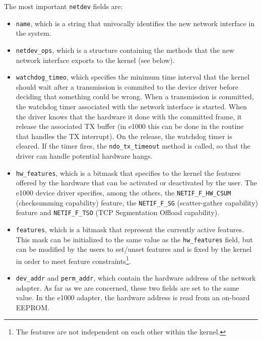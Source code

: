 The most important \texttt{netdev} fields are:
\begin{itemize}
    \item \texttt{name}, which is a string that univocally identifies the new network interface in the system.
    
    \item \texttt{netdev\_ops}, which is a structure containing the methods that the new network interface exports to the kernel 
	  (see below).
	  
    \item \texttt{watchdog\_timeo}, which specifies the minimum time interval that the kernel should wait after a transmission is commited
	  to the device driver before deciding that something could be wrong. When a transmission is committed, the watchdog timer 
	  associated with the network interface is started. When the driver knows that the hardware it done with the committed frame,
	  it release the associated TX buffer (in e1000 this can be done in the routine that handles the TX interrupt). On the release,
	  the watchdog timer is cleared. If the timer fires, the \texttt{ndo\_tx\_timeout} method is called, so that the driver can
	  handle potential hardware hangs.
	  
    \item \texttt{hw\_features}, which is a bitmask that specifies to the kernel the features offered by the hardware that can be activated
	  or deactivated by the user. The e1000 device driver specifies, among the others, the \texttt{NETIF\_F\_HW\_CSUM} (checksumming
	  capability) feature, the \texttt{NETIF\_F\_SG} (scatter-gather capability) feature and \texttt{NETIF\_F\_TSO} (TCP Segmentation
	  Offload capability).
	  
    \item \texttt{features}, which is a bitmask that represent the currently active features. This mask can be initialized to the same
	  value as the \texttt{hw\_features} field, but can be modified by the users to set/unset features and is fixed by the kernel in
	  order to meet feature constraints\footnote{The features are not independent on each other within the kernel.}.
	  
    \item \texttt{dev\_addr} and \texttt{perm\_addr}, which contain the hardware address of the network adapter. As far as we are
	  concerned, these two fields are set to the same value. In the e1000 adapter, the hardware address is read from an on-board
	  EEPROM.
\end{itemize}



